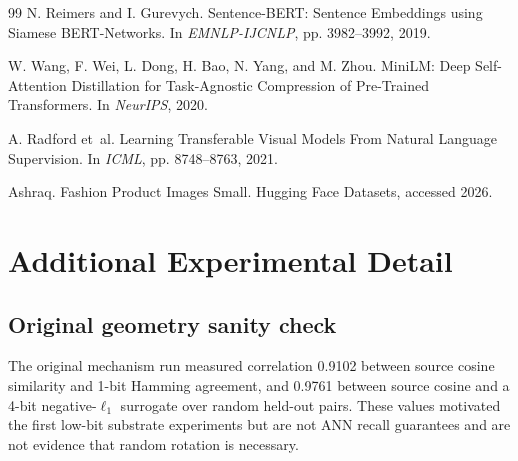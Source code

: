 \begin{thebibliography}{99}
N. Reimers and I. Gurevych. Sentence-BERT: Sentence Embeddings using Siamese BERT-Networks. In \emph{EMNLP-IJCNLP}, pp. 3982--3992, 2019.

W. Wang, F. Wei, L. Dong, H. Bao, N. Yang, and M. Zhou. MiniLM: Deep Self-Attention Distillation for Task-Agnostic Compression of Pre-Trained Transformers. In \emph{NeurIPS}, 2020.

A. Radford et~al. Learning Transferable Visual Models From Natural Language Supervision. In \emph{ICML}, pp. 8748--8763, 2021.

Ashraq. Fashion Product Images Small. Hugging Face Datasets, accessed 2026.

\end{thebibliography}

\appendix
\section{Additional Experimental Detail}

\subsection{Original geometry sanity check}
The original mechanism run measured correlation 0.9102 between source cosine similarity and 1-bit Hamming agreement, and 0.9761 between source cosine and a 4-bit negative-$\ell_1$ surrogate over random held-out pairs. These values motivated the first low-bit substrate experiments but are not ANN recall guarantees and are not evidence that random rotation is necessary.

